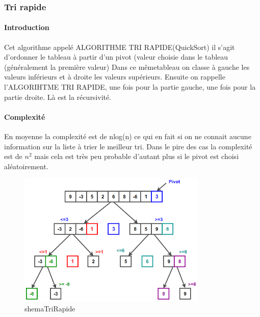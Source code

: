 \documentclass[11pt, a4paper]{article}
\begin{document}
\subsubsection{Tri rapide}
\paragraph{Introduction}
 Cet algorithme appelé ALGORITHME TRI RAPIDE(QuickSort)
 il s'agit d'ordonner le tableau à partir d'un pivot (valeur
 choisie dans le tableau (généralement la première valeur)
 Dans ce mêmetableau on classe à gauche les valeurs inférieurs et
 à droite les valeurs supérieurs.
 Ensuite on rappelle l'ALGORIHTME TRI RAPIDE,
 une fois pour la partie gauche, une fois pour la partie droite.
 Là est la récursivité.
 \paragraph{Complexité}
 En moyenne la complexité est de nlog(n) ce qui en fait si on ne connait aucune information sur la liste à trier le meilleur tri.
 Dans le pire des cas la complexité est de $n^{2}$ mais cela est très peu probable d'autant plus si le pivot est choisi aléatoirement.
 \begin{figure}[h]
     \centering
     \includegraphics[width=0.8\textwidth]{shemaTriRapide}
     \caption{shemaTriRapide}
     \label{fig:shemaTriRapide}
 \end{figure}
 \newpage
\end{document}
